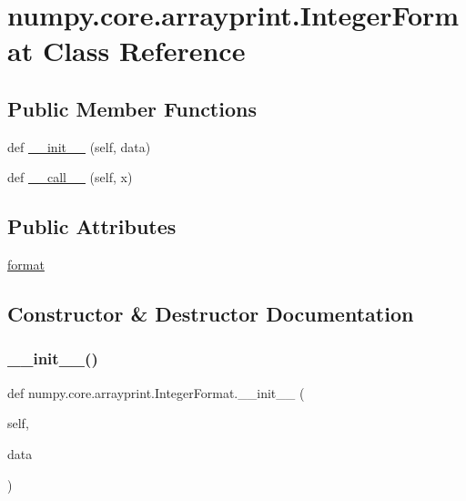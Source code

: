 \hypertarget{classnumpy_1_1core_1_1arrayprint_1_1IntegerFormat}{}\section{numpy.\+core.\+arrayprint.\+Integer\+Format Class Reference}
\label{classnumpy_1_1core_1_1arrayprint_1_1IntegerFormat}
\subsection*{Public Member Functions}
\begin{DoxyCompactItemize}
\item 
def \hyperlink{classnumpy_1_1core_1_1arrayprint_1_1IntegerFormat_a1222ae80e2d5bd530f7d0599ab679658}{\+\_\+\+\_\+init\+\_\+\+\_\+} (self, data)
\item 
def \hyperlink{classnumpy_1_1core_1_1arrayprint_1_1IntegerFormat_ae651d96d22eeb12d6956e63abbf43e25}{\+\_\+\+\_\+call\+\_\+\+\_\+} (self, x)
\end{DoxyCompactItemize}
\subsection*{Public Attributes}
\begin{DoxyCompactItemize}
\item 
\hyperlink{classnumpy_1_1core_1_1arrayprint_1_1IntegerFormat_addf4916b3999417618b15910df98f88c}{format}
\end{DoxyCompactItemize}


\subsection{Constructor \& Destructor Documentation}
\mbox{\label{classnumpy_1_1core_1_1arrayprint_1_1IntegerFormat_a1222ae80e2d5bd530f7d0599ab679658}} 
\subsubsection{\texorpdfstring{\+\_\+\+\_\+init\+\_\+\+\_\+()}{\_\_init\_\_()}}
{\footnotesize\ttfamily def numpy.\+core.\+arrayprint.\+Integer\+Format.\+\_\+\+\_\+init\+\_\+\+\_\+ (\begin{DoxyParamCaption}\item[{}]{self,  }\item[{}]{data }\end{DoxyParamCaption})}



